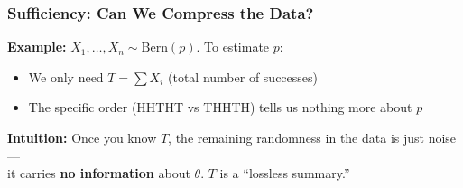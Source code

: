 \documentclass[aspectratio=169]{beamer}
\begin{document}
\begin{frame}
\frametitle{Sufficiency: Can We Compress the Data?}

\small
\textbf{Example:} $X_1, \ldots, X_n \sim \text{Bern}(p)$. To estimate $p$:
\begin{itemize}\setlength{\itemsep}{2pt}
  \item We only need $T = \sum X_i$ (total number of successes)
  \item The specific order (HHTHT vs THHTH) tells us nothing more about $p$
\end{itemize}

\vspace{0.2cm}
\begin{center}
\end{center}

\vspace{0.2cm}
\begin{center}
\small\textbf{Intuition:} Once you know $T$, the remaining randomness in the data is just noise ---\\
it carries \textbf{no information} about $\theta$. \;$T$ is a ``lossless summary.''
\end{center}
\end{frame}
\end{document}
